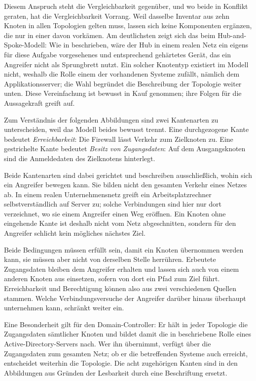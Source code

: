 Diesem Anspruch steht die Vergleichbarkeit gegenüber, und wo beide in Konflikt
geraten, hat die Vergleichbarkeit Vorrang. Weil dasselbe Inventar aus zehn
Knoten in allen Topologien gelten muss, lassen sich keine Komponenten
ergänzen, die nur in einer davon vorkämen. Am deutlichsten zeigt sich das beim
Hub-and-Spoke-Modell: Wie in  beschrieben, wäre
der Hub in einem realen Netz ein eigens für diese Aufgabe vorgesehenes und
entsprechend gehärtetes Gerät, das ein Angreifer nicht als Sprungbrett nutzt.
Ein solcher Knotentyp existiert im Modell nicht, weshalb die Rolle einem der
vorhandenen Systeme zufällt, nämlich dem Applikationsserver; die Wahl begründet
die Beschreibung der Topologie weiter unten. Diese Vereinfachung ist bewusst in
Kauf genommen; ihre Folgen für die Aussagekraft greift 
auf.

Zum Verständnis der folgenden Abbildungen sind zwei Kantenarten zu
unterscheiden, weil das Modell beides bewusst trennt. Eine durchgezogene Kante
bedeutet \emph{Erreichbarkeit}: Die Firewall lässt Verkehr zum Zielknoten zu.
Eine gestrichelte Kante bedeutet \emph{Besitz von Zugangsdaten}: Auf dem
Ausgangsknoten sind die Anmeldedaten des Zielknotens hinterlegt.

Beide Kantenarten sind dabei gerichtet und beschreiben ausschließlich, wohin
sich ein Angreifer bewegen kann. Sie bilden nicht den gesamten Verkehr eines
Netzes ab. In einem realen Unternehmensnetz greift ein Arbeitsplatzrechner
selbstverständlich auf Server zu; solche Verbindungen sind hier nur dort
verzeichnet, wo sie einem Angreifer einen Weg eröffnen. Ein Knoten ohne
eingehende Kante ist deshalb nicht vom Netz abgeschnitten, sondern für den
Angreifer schlicht kein mögliches nächstes Ziel.

Beide Bedingungen müssen erfüllt sein, damit ein Knoten übernommen werden kann,
sie müssen aber nicht von derselben Stelle herrühren. Erbeutete Zugangsdaten
bleiben dem Angreifer erhalten und lassen sich auch von einem anderen Knoten aus
einsetzen, sofern von dort ein Pfad zum Ziel führt. Erreichbarkeit und
Berechtigung können also aus zwei verschiedenen Quellen stammen. Welche
Verbindungsversuche der Angreifer darüber hinaus überhaupt unternehmen kann,
schränkt  weiter ein.

Eine Besonderheit gilt für den Domain-Controller: Er hält in jeder Topologie
die Zugangsdaten sämtlicher Knoten und bildet damit die in
 beschriebene Rolle eines
Active-Directory-Servers nach. Wer ihn übernimmt, verfügt über die Zugangsdaten
zum gesamten Netz; ob er die betreffenden Systeme auch erreicht, entscheidet
weiterhin die Topologie. Die acht zugehörigen Kanten sind in den Abbildungen
aus Gründen der Lesbarkeit durch eine Beschriftung ersetzt.

